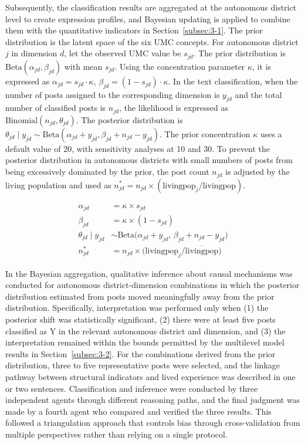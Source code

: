Subsequently, the classification results are aggregated at the autonomous district level to create expression profiles, and Bayesian updating is applied to combine them with the quantitative indicators in Section~\ref{subsec:3-1}. The prior distribution is the latent space of the six UMC concepts. For autonomous district $j$ in dimension $d$, let the observed UMC value be $s_{jd}$. The prior distribution is $\mathrm{Beta}(\alpha_{jd}, \beta_{jd})$ with mean $s_{jd}$. Using the concentration parameter $\kappa$, it is expressed as $\alpha_{jd} = s_{jd}\cdot\kappa$, $\beta_{jd} = (1 - s_{jd})\cdot\kappa$. In the text classification, when the number of posts assigned to the corresponding dimension is $y_{jd}$ and the total number of classified posts is $n_{jd}$, the likelihood is expressed as $\mathrm{Binomial}(n_{jd}, \theta_{jd})$. The posterior distribution is $\theta_{jd}\mid y_{jd} \sim \mathrm{Beta}(\alpha_{jd}+y_{jd}, \beta_{jd}+n_{jd}-y_{jd})$. The prior concentration $\kappa$ uses a default value of 20, with sensitivity analyses at 10 and 30. To prevent the posterior distribution in autonomous districts with small numbers of posts from being excessively dominated by the prior, the post count $n_{jd}$ is adjusted by the living population and used as $n_{jd}^{*} = n_{jd}\times(\text{livingpop}_{j}/\overline{\text{livingpop}})$.

\begin{align}
\alpha_{jd} &= \kappa \times s_{jd} \label{eq:alpha} \\
\beta_{jd}  &= \kappa \times (1 - s_{jd}) \label{eq:beta} \\
\theta_{jd}\mid y_{jd} &\sim \mathrm{Beta}\bigl(\alpha_{jd}+y_{jd},\, \beta_{jd}+n_{jd}-y_{jd}\bigr) \label{eq:posterior} \\
n_{jd}^{*} &= n_{jd}\times\bigl(\text{livingpop}_{j}/\overline{\text{livingpop}}\bigr) \label{eq:popadj}
\end{align}

In the Bayesian aggregation, qualitative inference about causal mechanisms was conducted for autonomous district-dimension combinations in which the posterior distribution estimated from posts moved meaningfully away from the prior distribution. Specifically, interpretation was performed only when (1) the posterior shift was statistically significant, (2) there were at least five posts classified as Y in the relevant autonomous district and dimension, and (3) the interpretation remained within the bounds permitted by the multilevel model results in Section~\ref{subsec:3-2}. For the combinations derived from the prior distribution, three to five representative posts were selected, and the linkage pathway between structural indicators and lived experience was described in one or two sentences. Classification and inference were conducted by three independent agents through different reasoning paths, and the final judgment was made by a fourth agent who compared and verified the three results. This followed a triangulation approach that controls bias through cross-validation from multiple perspectives rather than relying on a single protocol.

